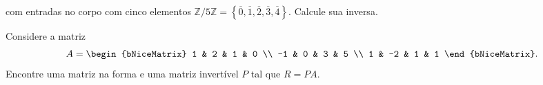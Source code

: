 \begin{questions}
  com entradas no corpo com cinco elementos
  \begin{math}
    \mathbb{Z}/5\mathbb{Z}=
    \left\{
    \overline{0},
    \overline{1},
    \overline{2},
    \overline{3},
    \overline{4}
    \right\}
  \end{math}.
  Calcule sua inversa.

  \begin{solutionordottedlines}
  \end{solutionordottedlines}

  \question\label{exercício:1.12}

  Considere a matriz
  \[
    A=
    \begin{bNiceMatrix}
      1  & 2  & 1 & 0 \\
      -1 & 0  & 3 & 5 \\
      1  & -2 & 1 & 1
    \end{bNiceMatrix}.
  \]
  Encontre uma matriz na forma e uma matriz invertível $P$ tal que
  $R=PA$.

  \begin{solutionordottedlines}
  \end{solutionordottedlines}
\end{questions}

